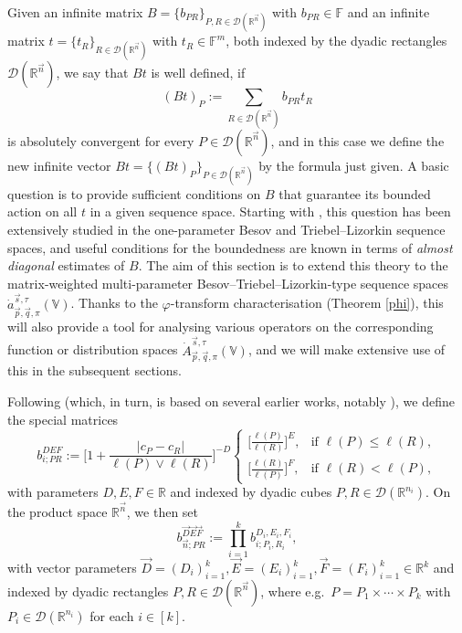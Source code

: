 \documentclass[11pt, reqno]{amsart}
\theoremstyle{definition}
\theoremstyle{remark}
\numberwithin{equation}{section}
\newcommand{\D}{\mathscr D}
\newcommand{\vD}{\vec D}
\newcommand{\vE}{\vec E}
\newcommand{\F}{\mathbb F}
\newcommand{\vF}{\vec F}
\newcommand{\R}{\mathbb R}
\newcommand{\V}{\mathbb V}
\newcommand{\vn}{\vec n}
\newcommand{\vp}{\vec p}
\newcommand{\vq}{\vec q}
\newcommand{\vs}{\vec s}
\newcommand{\Atau}{\dot A^{\vs,\tau}_{\vp,\vq,\pi}}
\newcommand{\atau}{\dot a^{\vs,\tau}_{\vp,\vq,\pi}}
\newcommand{\abs}[1]{|#1|}
\begin{document}
Given an infinite matrix $B=\{b_{PR}\}_{P,R\in\D(\R^{\vn})}$ with $b_{PR}\in\F$ and an infinite matrix $t=\{t_R\}_{R\in\D(\R^{\vn})}$ with $t_R\in\F^m$, both indexed by the dyadic rectangles $\D(\R^{\vn})$, we say that $Bt$ is well defined, if
\begin{equation*}
(Bt)_P:=\sum_{R\in\D(\R^{\vn})}b_{PR}t_R
\end{equation*}
is absolutely convergent for every $P\in\D(\R^{\vn})$, and in this case we define the new infinite vector $Bt=\{(Bt)_P\}_{P\in\D(\R^{\vn})}$ by the formula just given. A basic question is to provide sufficient conditions on $B$ that guarantee its bounded action on all $t$ in a given sequence space.
Starting with \cite{FJ90}, this question has been extensively studied in the one-parameter Besov and Triebel--Lizorkin sequence spaces,
and useful conditions for the boundedness are known in terms of {\em almost diagonal} estimates of $B$.
The aim of this section is to extend this theory to the matrix-weighted multi-parameter Besov--Triebel--Lizorkin-type sequence spaces $\atau(\V)$. Thanks to the $\varphi$-transform characterisation (Theorem \ref{phi}), this will also provide a tool for analysing various operators on the corresponding function or distribution spaces $\Atau(\V)$, and we will make extensive use of this in the subsequent sections.

Following \cite[Definition 3.1]{BHYY:1b} (which, in turn, is based on several earlier works, notably \cite[p.~53]{FJ90}), we define the special matrices
\begin{equation}\label{bDEF}
b^{DEF}_{i;PR}:=\bigg[1+\frac{\abs{c_P-c_R}}{\ell(P)\vee\ell(R)}\bigg]^{-D}
\begin{cases}
\displaystyle \Big[\frac{\ell(P)}{\ell(R)}\Big]^E,
& \text{if }\ell(P)\leq\ell(R), \\
\displaystyle \Big[\frac{\ell(R)}{\ell(P)}\Big]^F,
& \text{if }\ell(R)<\ell(P),
\end{cases}
\end{equation}
with parameters $D,E,F\in\R$ and indexed by dyadic cubes $P,R\in\D(\R^{n_i})$. On the product space $\R^{\vn}$, we then set
\begin{equation*}
b^{\vD \vE \vF}_{\vn;PR}:=\prod_{i=1}^k b^{D_i,E_i,F_i}_{i;P_i,R_i},
\end{equation*}
with vector parameters $\vD=(D_i)_{i=1}^k,\vE=(E_i)_{i=1}^k,\vF=(F_i)_{i=1}^k\in\R^k$ and indexed by dyadic rectangles $P,R\in\D(\R^{\vn})$, where e.g.\ $P=P_1\times\cdots\times P_k$ with $P_i\in\mathscr D(\R^{n_i})$ for each $i\in[k]$.
\end{document}
